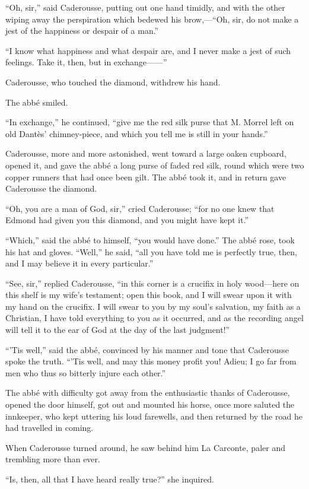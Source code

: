 “Oh, sir,” said Caderousse, putting out one hand timidly, and with the
other wiping away the perspiration which bedewed his brow,—“Oh, sir, do
not make a jest of the happiness or despair of a man.”

“I know what happiness and what despair are, and I never make a jest of
such feelings. Take it, then, but in exchange——”

Caderousse, who touched the diamond, withdrew his hand.

The abbé smiled.

“In exchange,” he continued, “give me the red silk purse that M. Morrel
left on old Dantès’ chimney-piece, and which you tell me is still in
your hands.”

Caderousse, more and more astonished, went toward a large oaken
cupboard, opened it, and gave the abbé a long purse of faded red silk,
round which were two copper runners that had once been gilt. The abbé
took it, and in return gave Caderousse the diamond.

“Oh, you are a man of God, sir,” cried Caderousse; “for no one knew
that Edmond had given you this diamond, and you might have kept it.”

“Which,” said the abbé to himself, “you would have done.” The abbé
rose, took his hat and gloves. “Well,” he said, “all you have told me
is perfectly true, then, and I may believe it in every particular.”

“See, sir,” replied Caderousse, “in this corner is a crucifix in holy
wood—here on this shelf is my wife’s testament; open this book, and I
will swear upon it with my hand on the crucifix. I will swear to you by
my soul’s salvation, my faith as a Christian, I have told everything to
you as it occurred, and as the recording angel will tell it to the ear
of God at the day of the last judgment!”

“’Tis well,” said the abbé, convinced by his manner and tone that
Caderousse spoke the truth. “’Tis well, and may this money profit you!
Adieu; I go far from men who thus so bitterly injure each other.”

The abbé with difficulty got away from the enthusiastic thanks of
Caderousse, opened the door himself, got out and mounted his horse,
once more saluted the innkeeper, who kept uttering his loud farewells,
and then returned by the road he had travelled in coming.

When Caderousse turned around, he saw behind him La Carconte, paler and
trembling more than ever.

“Is, then, all that I have heard really true?” she inquired.

